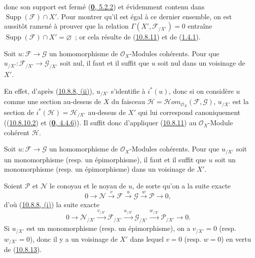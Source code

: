 
donc son support est fermé (\hyperref[0.5.2.2-fr]{\textbf{0}, 5.2.2}) et
évidemment contenu dans $\operatorname{Supp}(\mathscr{F})\cap X'$. Pour
montrer qu'il est égal à ce dernier ensemble, on est aussitôt ramené à
prouver que la relation $\Gamma(X',\mathscr{F}_{/X'})=0$ entraîne
$\operatorname{Supp}(\mathscr{F})\cap X'=\varnothing$~; or cela résulte de
(\hyperref[I.10.8.11-fr]{10.8.11}) et de
(\hyperref[I.1.4.1-fr]{1.4.1}).

\begin{corollary}[10.8.13]
\label{I.10.8.13-fr}
Soit $u:\mathscr{F}\to\mathscr{G}$ un homomorphisme de
$\mathscr{O}_X$-Modules cohérents. Pour que
$u_{/X'}:\mathscr{F}_{/X'}\to\mathscr{G}_{/X'}$ soit nul, il faut et il
suffit que $u$ soit nul dans un voisinage de $X'$.
\end{corollary}

En effet, d'après (\hyperref[I.10.8.8-fr]{10.8.8, (ii)}), $u_{/X'}$
s'identifie à $i^*(u)$, donc si on considère $u$ comme une section au-dessus
de $X$ du faisceau
$\mathscr{H}=\mathscr{H}\!om_{\mathscr{O}_X}(\mathscr{F},\mathscr{G})$,
$u_{/X'}$ est la section de
$i^*(\mathscr{H})=\mathscr{H}_{/X'}$ au-dessus de $X'$ qui lui correspond
canoniquement ((\hyperref[I.10.8.10.2-fr]{10.8.10.2}) et
(\hyperref[0.4.4.6-fr]{\textbf{0}, 4.4.6})). Il suffit donc d'appliquer
(\hyperref[I.10.8.11-fr]{10.8.11}) au $\mathscr{O}_X$-Module cohérent
$\mathscr{H}$.

\begin{corollary}[10.8.14]
\label{I.10.8.14-fr}
Soit $u:\mathscr{F}\to\mathscr{G}$ un homomorphisme de
$\mathscr{O}_X$-Modules cohérents. Pour que $u_{/X'}$ soit un monomorphisme
\textup{(resp.} un épimorphisme), il faut et il suffit que $u$ soit un monomorphisme
\textup{(resp.} un épimorphisme) dans un voisinage de $X'$.
\end{corollary}

Soient $\mathscr{P}$ et $\mathscr{N}$ le conoyau et le noyau de $u$, de
sorte qu'on a la suite exacte
\[
  0\to\mathscr{N}\xrightarrow{v}\mathscr{F}\xrightarrow{u}
  \mathscr{G}\xrightarrow{w}\mathscr{P}\to0,
\]
d'où (\hyperref[I.10.8.8-fr]{10.8.8, (i)}) la suite exacte
\[
  0\to\mathscr{N}_{/X'}\xrightarrow{v_{/X'}}
  \mathscr{F}_{/X'}\xrightarrow{u_{/X'}}
  \mathscr{G}_{/X'}\xrightarrow{w_{/X'}}
  \mathscr{P}_{/X'}\to0.
\]
Si $u_{/X'}$ est un monomorphisme (resp. un épimorphisme), on a
$v_{/X'}=0$ (resp. $w_{/X'}=0$), donc il y a un voisinage de $X'$ dans
lequel $v=0$ (resp. $w=0$) en vertu de
(\hyperref[I.10.8.13-fr]{10.8.13}).

